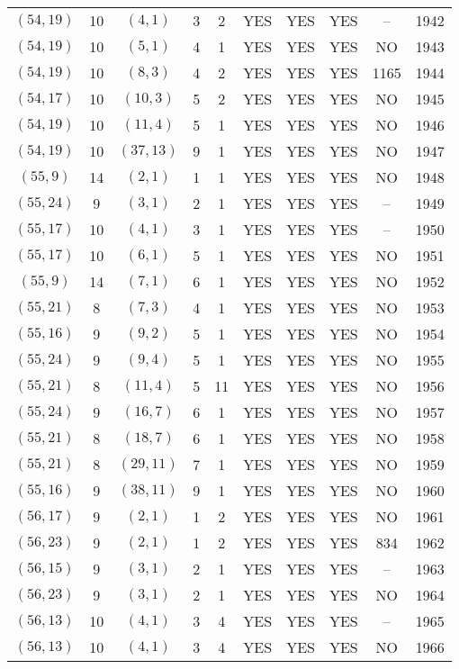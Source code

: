 \begin{longtable}{|c|c|c|c|c|c|c|c|c|c|}
$(54, 19)$ & 10 & $(4, 1)$ & 3 & 2 & YES & YES & YES & -- & 1942\\
$(54, 19)$ & 10 & $(5, 1)$ & 4 & 1 & YES & YES & YES & NO & 1943\\
$(54, 19)$ & 10 & $(8, 3)$ & 4 & 2 & YES & YES & YES & 1165 & 1944\\
$(54, 17)$ & 10 & $(10, 3)$ & 5 & 2 & YES & YES & YES & NO & 1945\\
$(54, 19)$ & 10 & $(11, 4)$ & 5 & 1 & YES & YES & YES & NO & 1946\\
$(54, 19)$ & 10 & $(37, 13)$ & 9 & 1 & YES & YES & YES & NO & 1947\\
$(55, 9)$ & 14 & $(2, 1)$ & 1 & 1 & YES & YES & YES & NO & 1948\\
$(55, 24)$ & 9 & $(3, 1)$ & 2 & 1 & YES & YES & YES & -- & 1949\\
$(55, 17)$ & 10 & $(4, 1)$ & 3 & 1 & YES & YES & YES & -- & 1950\\
$(55, 17)$ & 10 & $(6, 1)$ & 5 & 1 & YES & YES & YES & NO & 1951\\
$(55, 9)$ & 14 & $(7, 1)$ & 6 & 1 & YES & YES & YES & NO & 1952\\
$(55, 21)$ & 8 & $(7, 3)$ & 4 & 1 & YES & YES & YES & NO & 1953\\
$(55, 16)$ & 9 & $(9, 2)$ & 5 & 1 & YES & YES & YES & NO & 1954\\
$(55, 24)$ & 9 & $(9, 4)$ & 5 & 1 & YES & YES & YES & NO & 1955\\
$(55, 21)$ & 8 & $(11, 4)$ & 5 & 11 & YES & YES & YES & NO & 1956\\
$(55, 24)$ & 9 & $(16, 7)$ & 6 & 1 & YES & YES & YES & NO & 1957\\
$(55, 21)$ & 8 & $(18, 7)$ & 6 & 1 & YES & YES & YES & NO & 1958\\
$(55, 21)$ & 8 & $(29, 11)$ & 7 & 1 & YES & YES & YES & NO & 1959\\
$(55, 16)$ & 9 & $(38, 11)$ & 9 & 1 & YES & YES & YES & NO & 1960\\
$(56, 17)$ & 9 & $(2, 1)$ & 1 & 2 & YES & YES & YES & NO & 1961\\
$(56, 23)$ & 9 & $(2, 1)$ & 1 & 2 & YES & YES & YES & 834 & 1962\\
$(56, 15)$ & 9 & $(3, 1)$ & 2 & 1 & YES & YES & YES & -- & 1963\\
$(56, 23)$ & 9 & $(3, 1)$ & 2 & 1 & YES & YES & YES & NO & 1964\\
$(56, 13)$ & 10 & $(4, 1)$ & 3 & 4 & YES & YES & YES & -- & 1965\\
$(56, 13)$ & 10 & $(4, 1)$ & 3 & 4 & YES & YES & YES & NO & 1966\\

\end{longtable}
